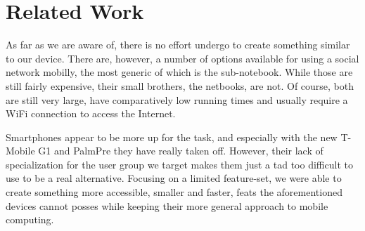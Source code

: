 %
%
%
\section{Related Work}
As far as we are aware of, there is no effort undergo to create something similar to our device. There are,
however, a number of options available for using a social network mobilly, the most generic of which is the 
sub-notebook. While those are still fairly expensive, their small brothers, the netbooks, are not. Of course,
both are still very large, have comparatively low running times and usually require a WiFi connection to 
access the Internet. 

Smartphones appear to be more up for the task, and especially with the new T-Mobile G1 and 
Palm\registered Pre they have really taken off. However, their lack of specialization for the user 
group we target makes them just a tad too difficult to use to be a real alternative. 
Focusing on a limited feature-set, we were able to create something more accessible, smaller and 
faster, feats the aforementioned devices cannot posses while keeping their more general approach to 
mobile computing.

